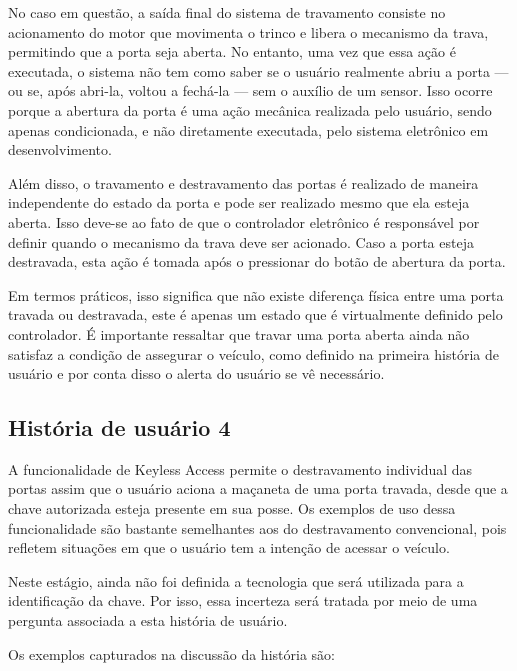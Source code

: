 No caso em questão, a saída final do sistema de travamento consiste no acionamento do motor que movimenta o trinco e libera o mecanismo da trava, permitindo 
que a porta seja aberta. No entanto, uma vez que essa ação é executada, o sistema não tem como saber se o usuário realmente abriu a porta — ou se, após abri-la, 
voltou a fechá-la — sem o auxílio de um sensor. Isso ocorre porque a abertura da porta é uma ação mecânica realizada pelo usuário, sendo apenas condicionada, e 
não diretamente executada, pelo sistema eletrônico em desenvolvimento.

Além disso, o travamento e destravamento das portas é realizado de maneira independente do estado da porta e pode ser realizado mesmo que ela esteja aberta. Isso 
deve-se ao fato de que o controlador eletrônico é responsável por definir quando o mecanismo da trava deve ser acionado. Caso a porta esteja destravada, esta ação 
é tomada após o pressionar do botão de abertura da porta.

Em termos práticos, isso significa que não existe diferença física entre uma porta travada ou destravada, este é apenas um estado que é virtualmente definido 
pelo controlador. É importante ressaltar que travar uma porta aberta ainda não satisfaz a condição de assegurar o veículo, como definido na primeira história 
de usuário e por conta disso o alerta do usuário se vê necessário.

\subsection{História de usuário 4}

A funcionalidade de Keyless Access permite o destravamento individual das portas assim que o usuário aciona a maçaneta de uma porta travada, desde que a chave 
autorizada esteja presente em sua posse. Os exemplos de uso dessa funcionalidade são bastante semelhantes aos do destravamento convencional, pois refletem 
situações em que o usuário tem a intenção de acessar o veículo. 

Neste estágio, ainda não foi definida a tecnologia que será utilizada para a identificação da chave. Por isso, essa incerteza será tratada por meio de uma 
pergunta associada a esta história de usuário.

Os exemplos capturados na discussão da história são:

